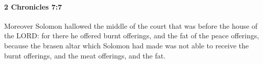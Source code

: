 
		\paragraph{2 Chronicles 7:7} %
			\label{2CHRONICLES-7-7}

			Moreover Solomon hallowed the middle of the court that was before the house of the LORD: for there he offered burnt offerings, and the fat of the peace offerings, because the brasen altar which Solomon had made was not able to receive the burnt offerings, and the meat offerings, and the fat.


